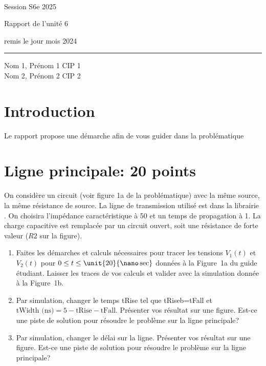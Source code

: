 \documentclass[DIV=15,paper=letter,titlepage=true,fontsize=12pt,headings=normal,captions=nooneline]{scrartcl}
\begin{document}
\thispagestyle{empty}
\noindent
\begin{center}
{\bfseries\sffamily {}\\[4pt] }

\vspace{3cm}
\textsf{\large Session S6e 2025}

\vspace{.5cm}
\textsf{\Large Rapport de l'unité 6}

\vspace{.25cm}
\textsf{\footnotesize remis le jour mois 2024}

\end{center}
\vfill

\noindent
\rule{\linewidth}{.8pt}

\noindent
Nom 1, Prénom 1 \hfill CIP 1\\
Nom 2, Prénom 2 \hfill CIP 2\\

\newpage
\section{Introduction}
Le rapport propose une démarche afin de vous guider dans la problématique

\section{Ligne principale: 20 points}

On considère un circuit (voir figure 1a de la problématique) avec la même source, la même résistance de source. La ligne de transmission utilisé est  dans la librairie . On choisira l'impédance caractéristique à \unit{50}{\ohm} et un temps de propagation à \unit{1}{\nano\sec}. La charge capacitive est remplacée par un circuit ouvert, soit une résistance de forte valeur ($R2$ sur la figure).
\begin{enumerate}
	\item Faites les démarches et calculs nécessaires pour tracer les tensions $V_1(t)$ et $V_2(t)$ pour $0\leq t\leq \unit{20}{\nano\sec}$ données à la Figure~1a du guide étudiant. Laisser les traces de vos calculs et valider avec la simulation donnée à la Figure~1b.
	\item Par simulation, changer le temps tRise tel que tRiseb=tFall et $\textrm{tWidth (ns)} = 5 - \textrm{tRise} - \textrm{tFall}$. Présenter vos résultat sur une figure. Est-ce une piste de solution pour résoudre le problème sur la ligne principale?
	\item Par simulation, changer le délai sur la ligne. Présenter vos résultat sur une figure. Est-ce une piste de solution pour résoudre le problème  sur la ligne principale?
\end{enumerate}
\end{document}
